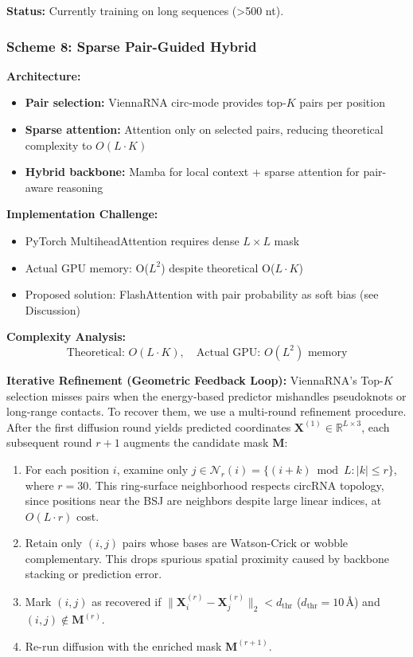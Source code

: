 \documentclass[12pt]{article}
\begin{document}
\textbf{Status:} Currently training on long sequences (>500 nt).

\subsubsection{Scheme 8: Sparse Pair-Guided Hybrid}

\textbf{Architecture:}
\begin{itemize}
\item \textbf{Pair selection:} ViennaRNA circ-mode provides top-$K$ pairs per position
\item \textbf{Sparse attention:} Attention only on selected pairs, reducing theoretical complexity to $O(L \cdot K)$
\item \textbf{Hybrid backbone:} Mamba for local context + sparse attention for pair-aware reasoning
\end{itemize}

\textbf{Implementation Challenge:}
\begin{itemize}
\item PyTorch MultiheadAttention requires dense $L \times L$ mask
\item Actual GPU memory: O($L^2$) despite theoretical O($L \cdot K$)
\item Proposed solution: FlashAttention with pair probability as soft bias (see Discussion)
\end{itemize}

\textbf{Complexity Analysis:}
\begin{equation}
\text{Theoretical: } O(L \cdot K), \quad \text{Actual GPU: } O(L^2) \text{ memory}
\end{equation}

\textbf{Iterative Refinement (Geometric Feedback Loop):}
ViennaRNA's Top-$K$ selection misses pairs when the energy-based predictor mishandles pseudoknots or long-range contacts. To recover them, we use a multi-round refinement procedure. After the first diffusion round yields predicted coordinates $\mathbf{X}^{(1)} \in \mathbb{R}^{L \times 3}$, each subsequent round $r+1$ augments the candidate mask $\mathbf{M}$:

\begin{enumerate}
\item For each position $i$, examine only $j \in \mathcal{N}_r(i) = \{(i+k) \bmod L : |k| \leq r\}$, where $r=30$. This ring-surface neighborhood respects circRNA topology, since positions near the BSJ are neighbors despite large linear indices, at $O(L \cdot r)$ cost.
\item Retain only $(i,j)$ pairs whose bases are Watson-Crick or wobble complementary. This drops spurious spatial proximity caused by backbone stacking or prediction error.
\item Mark $(i,j)$ as recovered if $\lVert \mathbf{X}^{(r)}_i - \mathbf{X}^{(r)}_j \rVert_2 < d_{\text{thr}}$ ($d_{\text{thr}}=10$\,\AA) and $(i,j) \notin \mathbf{M}^{(r)}$.
\item Re-run diffusion with the enriched mask $\mathbf{M}^{(r+1)}$.
\end{enumerate}
\end{document}
